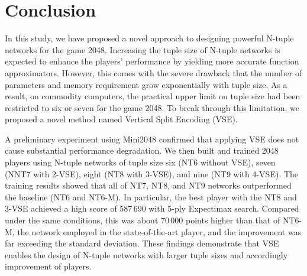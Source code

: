 \section{Conclusion}
In this study, we have proposed a novel approach to designing powerful N-tuple networks for the game 2048.
Increasing the tuple size of N-tuple networks is expected to enhance the players' performance by yielding more accurate function approximators.  However, this comes with the severe drawback that the number of parameters and memory requirement grow exponentially with tuple size.  As a result, on commodity computers, the practical upper limit on tuple size had been restricted to six or seven for the game 2048.
To break through this limitation, we proposed a novel method named Vertical Split Encoding (VSE).


A preliminary experiment using Mini2048 confirmed that applying VSE does not cause substantial performance degradation.
We then built and trained 2048 players using N-tuple networks of tuple size six (NT6 without VSE), seven (NNT7 with 2-VSE), eight (NT8 with 3-VSE), and nine (NT9 with 4-VSE).
The training results showed that all of NT7, NT8, and NT9 networks outperformed the baseline (NT6 and NT6-M).
In particular, the best player with the NT8 and 3-VSE achieved a high score of 587\,690 with 5-ply Expectimax search. Compared under the same conditions, this was about 70\,000 points higher than that of NT6-M, the network employed in the state-of-the-art player, and the improvement was far exceeding the standard deviation.
These findings demonstrate that VSE enables the design of N-tuple networks with larger tuple sizes and accordingly improvement of players.

